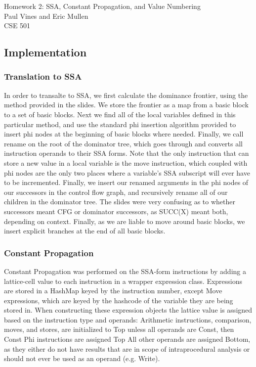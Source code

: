 \documentclass[12pt,letterpaper]{article}
\begin{document}
\begin{flushright}
Homework 2: SSA, Constant Propagation, and Value Numbering\\
Paul Vines and Eric Mullen\\
CSE 501\\
\end{flushright}
\subsection*{Implementation}
\subsubsection*{Translation to SSA}
In order to transalte to SSA, we first calculate the dominance
frontier, using the method provided in the slides. We store the
frontier as a map from a basic block to a set of basic blocks. Next we
find all of the local variables defined in this particular method, and
use the standard phi insertion algorithm provided to insert phi nodes
at the beginning of basic blocks where needed. Finally, we call rename
on the root of the dominator tree, which goes through and converts all
instruction operands to their SSA forms. Note that the only
instruction that can store a new value in a local variable is the move
instruction, which coupled with phi nodes are the only two places
where a variable's SSA subscript will ever have to be
incremented. Finally, we insert our renamed arguments in the phi nodes
of our successors in the control flow graph, and recursively rename
all of our children in the dominator tree. The slides were very
confusing as to whether successors meant CFG or dominator successors,
as SUCC(X) meant both, depending on context. Finally, as we are liable
to move around basic blocks, we insert explicit branches at the end of
all basic blocks.

\subsubsection*{Constant Propagation}
Constant Propagation was performed on the SSA-form instructions by
adding a lattice-cell value to each instruction in a wrapper
expression class. Expressions are stored in a HashMap keyed by the
instruction number, except Move expressions, which are keyed by the
hashcode of the variable they are being stored in. When constructing
these expression objects the lattice value is assigned based on the
instruction type and operands: Arithmetic instructions, comparison,
moves, and stores, are initialized to Top unless all operands are
Const, then Const Phi instructions are assigned Top All other operands
are assigned Bottom, as they either do not have results that are in
scope of intraprocedural analysis or should not ever be used as an
operand (e.g. Write).
\end{document}
